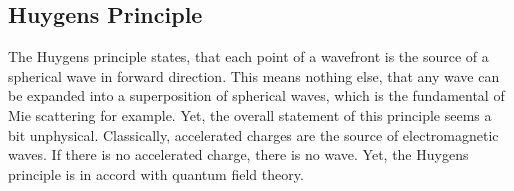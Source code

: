 \documentclass[letterpaper,10pt,english]{sphinxmanual}
\begin{document}
{\begin{sphinxVerbatim}[commandchars=\\\{\}]
 
                      
                      
                      
                      
                      
                       
                       
                       
                       
                       
                       
\end{sphinxVerbatim}
}


\subsection{Huygens Principle}
\label{\detokenize{notebooks/L12/Diffraction:Huygens-Principle}}
The Huygens principle states, that each point of a wavefront is the source of a spherical wave in forward direction. This means nothing else, that any wave can be expanded into a superposition of spherical waves, which is the fundamental of Mie scattering for example. Yet, the overall statement of this principle seems a bit unphysical. Classically, accelerated charges are the source of electromagnetic waves. If there is no accelerated charge, there is no wave. Yet, the Huygens principle is in
accord with quantum field theory.
\end{document}

